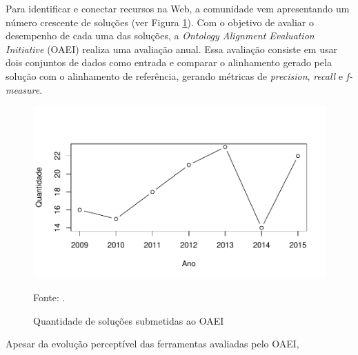 Para identificar e conectar recursos na Web, a comunidade vem apresentando um número crescente de soluções (ver Figura \ref{fig:oaei_imtools}). Com o objetivo de avaliar o desempenho de cada uma das soluções, a \textit{Ontology Alignment Evaluation Initiative} (OAEI) realiza uma avaliação anual. Essa avaliação consiste em usar dois conjuntos de dados como entrada e comparar o alinhamento gerado pela solução com o alinhamento de referência, gerando métricas de \textit{precision}, \textit{recall} e \textit{f-measure}.

\begin{figure}[!ht]
	\centering
	\includegraphics[width=1\textwidth]{./imagens/im_tools.pdf}
    \caption{Quantidade de soluções submetidas ao OAEI}
	\footnotesize{Fonte: \cite{cheatham2015results}.}
	\label{fig:oaei_imtools}
\end{figure}

Apesar da evolução perceptível das ferramentas avaliadas pelo OAEI, 





